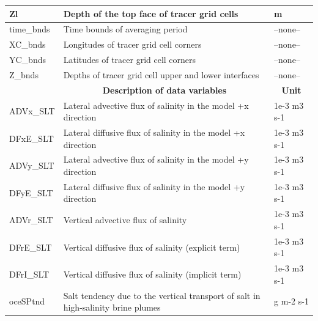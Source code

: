 \begin{longtable}{|m{}|m{}|m{}|}
Zl &Depth of the top face of tracer grid cells &m  \\ \hline
time\_bnds &Time bounds of averaging period &--none--  \\ \hline
XC\_bnds &Longitudes of tracer grid cell corners &--none--  \\ \hline
YC\_bnds &Latitudes of tracer grid cell corners &--none--  \\ \hline
Z\_bnds &Depths of tracer grid cell upper and lower interfaces &--none--  \\ \hline
\rowcolor{lightgray} \multicolumn{1}{|c|}{\textbf{Variables}} & \multicolumn{1}{|c|}{\textbf{Description of data variables}} &  \multicolumn{1}{|c|}{\textbf{Unit}}\\ \hline
ADVx\_SLT &Lateral advective flux of salinity in the model +x direction &1e-3 m3 s-1  \\ \hline
DFxE\_SLT &Lateral diffusive flux of salinity in the model +x direction &1e-3 m3 s-1  \\ \hline
ADVy\_SLT &Lateral advective flux of salinity in the model +y direction &1e-3 m3 s-1  \\ \hline
DFyE\_SLT &Lateral diffusive flux of salinity in the model +y direction &1e-3 m3 s-1  \\ \hline
ADVr\_SLT &Vertical advective flux of salinity &1e-3 m3 s-1  \\ \hline
DFrE\_SLT &Vertical diffusive flux of salinity (explicit term) &1e-3 m3 s-1  \\ \hline
DFrI\_SLT &Vertical diffusive flux of salinity (implicit term) &1e-3 m3 s-1  \\ \hline
oceSPtnd &Salt tendency due to the vertical transport of salt in high-salinity brine plumes &g m-2 s-1  \\ \hline
\end{longtable}

\newp
\pagebreak
